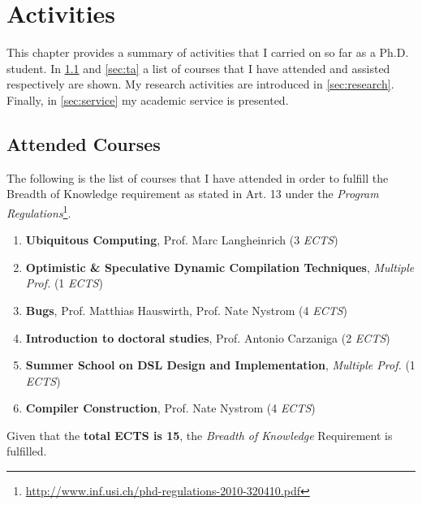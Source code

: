 
\newenvironment{courses}{\begin{enumerate}}{\end{enumerate}}

\newcommand{\course}[4]{\item[\textit{#1}] \textbf{#2}, #3 (#4 \emph{ECTS})}

\newenvironment{tas}{\begin{enumerate}}{\end{enumerate}}

\newcommand{\ta}[6]{
\item[\textit{#1}] \textbf{#2}, Prof. #3 (#4 \emph{ECTS}, #5) \\
{\footnotesize \url{#6}}
}

\chapter{\phd{} Activities}

\label{ch:phd-timeline}

This chapter provides a summary of activities that I carried on so far as a Ph.D. student.
In \cref{sec:ects} and \cref{sec:ta} a list of courses that I have
attended and assisted respectively are shown.
My research activities are introduced in \cref{sec:research}.
Finally, in \cref{sec:service} my academic service is presented.

\section{Attended Courses} \label{sec:ects}

The following is the list of courses that I have attended in order to fulfill the Breadth of Knowledge requirement as stated in Art. 13 under the \emph{\phd{} Program Regulations}\footnote{\url{http://www.inf.usi.ch/phd-regulations-2010-320410.pdf}}.

\begin{courses}
\course{Fall '13}{Ubiquitous Computing}{Prof. Marc Langheinrich}{3}
\course{Fall '13}{Optimistic \& Speculative Dynamic Compilation Techniques}{\emph{Multiple Prof.}}{1}
\course{Spring '14}{Bugs}{Prof. Matthias Hauswirth, Prof. Nate Nystrom}{4}
\course{Spring '14}{Introduction to doctoral studies}{Prof. Antonio Carzaniga}{2}
\course{Spring '15}{Summer School on DSL Design and Implementation}{\emph{Multiple Prof.}}{1}
\course{Spring '17}{Compiler Construction}{Prof. Nate Nystrom}{4}
\end{courses}

Given that the \textbf{total ECTS is 15}, the \emph{Breadth of Knowledge} Requirement is fulfilled.


